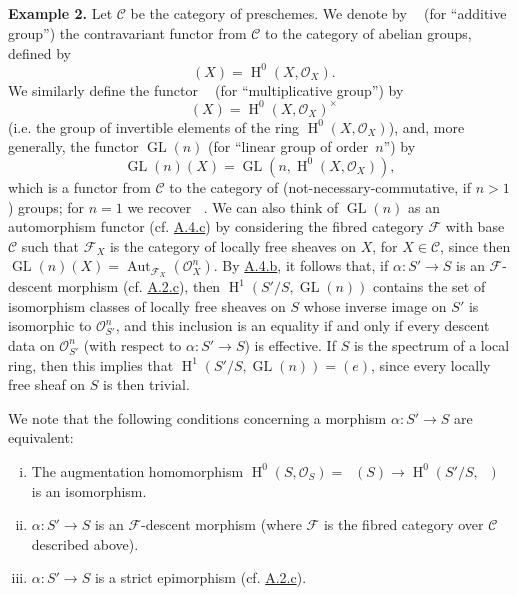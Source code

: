 \documentclass{article}
\newenvironment{rmenv}[1]
  {\phantomsection\par\medskip\noindent\textbf{#1.}\rmfamily}
  {\par\medskip}
\newcommand{\scr}[1]{{\mathscr{#1}}}
\renewcommand{\cal}[1]{{\mathcal{#1}}}
\DeclareMathOperator{\Aut}{Aut}
\DeclareMathOperator{\HH}{H}
\DeclareMathOperator{\GL}{GL}
\DeclareMathOperator{\Ga}{G_a}
\DeclareMathOperator{\Gm}{G_m}
\newcommand{\oldpage}[1]{\marginpar{\footnotesize$\Big\vert$ \textit{p.~#1}}}
\begin{document}
\subsection{}
\label{A.4.e}

\begin{rmenv}{Example 2}
  Let $\cal{C}$ be the category of preschemes.
  We denote by $\Ga$ (for ``additive group'') the contravariant functor from $\cal{C}$ to the category of abelian groups, defined by
  \[
    \Ga(X) = \HH^0(X,\scr{O}_X).
  \]
  We similarly define the functor $\Gm$ (for ``multiplicative group'') by
  \[
    \Gm(X) = \HH^0(X,\scr{O}_X)^\times
  \]
  (i.e. the group of invertible elements of the ring $\HH^0(X,\scr{O}_X)$), and, more generally, the functor $\GL(n)$ (for ``linear group of order~$n$'') by
\oldpage{190-15}
  \[
    \GL(n)(X) = \GL(n,\HH^0(X,\scr{O}_X)),
  \]
  which is a functor from $\cal{C}$ to the category of (not-necessary-commutative, if $n>1$) groups;
  for $n=1$ we recover $\Gm$.
  We can also think of $\GL(n)$ as an automorphism functor (cf. \hyperref[A.4.c]{A.4.c}) by considering the fibred category $\cal{F}$ with base $\cal{C}$ such that $\cal{F}_X$ is the category of locally free sheaves on $X$, for $X\in\cal{C}$, since then $\GL(n)(X)=\Aut_{\cal{F}_X}(\scr{O}_X^n)$.
  By \hyperref[A.4.b]{A.4.b}, it follows that, if $\alpha\colon S'\to S$ is an $\cal{F}$-descent morphism (cf. \hyperref[A.2.c]{A.2.c}), then $\HH^1(S'/S,\GL(n))$ contains the set of isomorphism classes of locally free sheaves on $S$ whose inverse image on $S'$ is isomorphic to $\scr{O}_{S'}^n$, and this inclusion is an equality if and only if every descent data on $\scr{O}_{S'}^n$ (with respect to $\alpha\colon S'\to S$) is effective.
  If $S$ is the spectrum of a local ring, then this implies that $\HH^1(S'/S,\GL(n))=(e)$, since every locally free sheaf on $S$ is then trivial.

  We note that the following conditions concerning a morphism $\alpha\colon S'\to S$ are equivalent:
  \begin{enumerate}[(i)]
    \item The augmentation homomorphism $\HH^0(S,\scr{O}_S) = \Ga(S)\to\HH^0(S'/S,\Ga)$ is an isomorphism.
    \item $\alpha\colon S'\to S$ is an $\cal{F}$-descent morphism (where $\cal{F}$ is the fibred category over $\cal{C}$ described above).
    \item $\alpha\colon S'\to S$ is a strict epimorphism (cf. \hyperref[A.2.c]{A.2.c}).
  \end{enumerate}


\end{rmenv}
\end{document}
